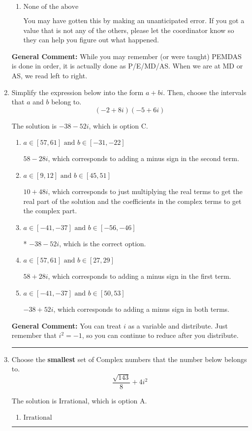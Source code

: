 \documentclass{extbook}[14pt]
\newcommand{\litem}[1]{\item #1

\rule{\textwidth}{0.4pt}}
\begin{document}
\begin{enumerate}
{\begin{enumerate}[label=\Alph*.]
 150.003, which corresponds to two Order of Operations errors.
\item \( \text{None of the above} \)

 You may have gotten this by making an unanticipated error. If you got a value that is not any of the others, please let the coordinator know so they can help you figure out what happened.
\end{enumerate}

\textbf{General Comment:} While you may remember (or were taught) PEMDAS is done in order, it is actually done as P/E/MD/AS. When we are at MD or AS, we read left to right.
}
\litem{
Simplify the expression below into the form $a+bi$. Then, choose the intervals that $a$ and $b$ belong to.
\[ (-2 + 8 i)(-5 + 6 i) \]

The solution is \( -38 - 52 i \), which is option C.\begin{enumerate}[label=\Alph*.]
\item \( a \in [57, 61] \text{ and } b \in [-31, -22] \)

 $58 - 28 i$, which corresponds to adding a minus sign in the second term.
\item \( a \in [9, 12] \text{ and } b \in [45, 51] \)

 $10 + 48 i$, which corresponds to just multiplying the real terms to get the real part of the solution and the coefficients in the complex terms to get the complex part.
\item \( a \in [-41, -37] \text{ and } b \in [-56, -46] \)

* $-38 - 52 i$, which is the correct option.
\item \( a \in [57, 61] \text{ and } b \in [27, 29] \)

 $58 + 28 i$, which corresponds to adding a minus sign in the first term.
\item \( a \in [-41, -37] \text{ and } b \in [50, 53] \)

 $-38 + 52 i$, which corresponds to adding a minus sign in both terms.
\end{enumerate}

\textbf{General Comment:} You can treat $i$ as a variable and distribute. Just remember that $i^2=-1$, so you can continue to reduce after you distribute.
}
\litem{
Choose the \textbf{smallest} set of Complex numbers that the number below belongs to.
\[ \frac{\sqrt{143}}{8}+4i^2 \]

The solution is \( \text{Irrational} \), which is option A.\begin{enumerate}[label=\Alph*.]
\item \( \text{Irrational} \)


\end{enumerate}}
\end{enumerate}
\end{document}
